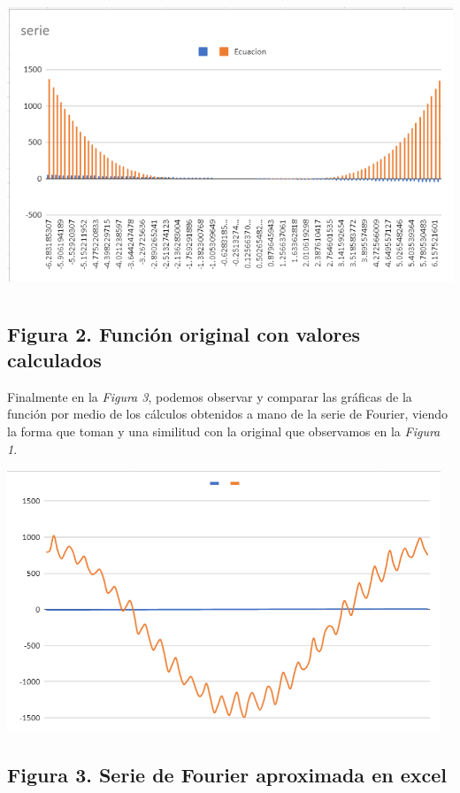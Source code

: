 \includegraphics[width=6.26772in,height=3.44444in]{media/image10.png}

\subsection{Figura 2. Función original con valores calculados}\label{figura-2.-funciuxf3n-original-con-valores-calculados}

Finalmente en la \emph{Figura 3}, podemos observar y comparar las gráficas de la función por medio de los cálculos obtenidos a mano de la serie de Fourier, viendo la forma que toman y una similitud con la original que observamos en la \emph{Figura 1}.

\includegraphics[width=5.10573in,height=3.08055in]{media/image16.png}

\subsection{Figura 3. Serie de Fourier aproximada en excel}\label{figura-3.-serie-de-fourier-aproximada-en-excel}
